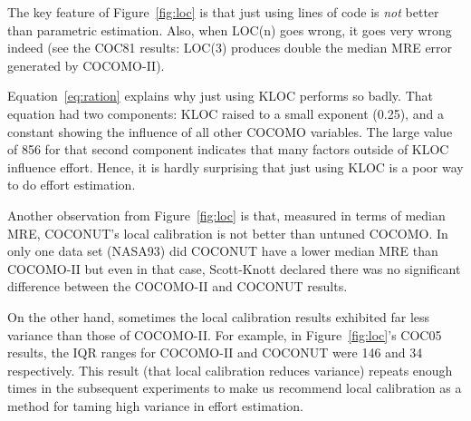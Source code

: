 \documentclass[smallcondesed]{svjour3}
\newcommand{\fig}[1]{Figure~\ref{fig:#1}}
\newcommand{\eq}[1]{Equation~\ref{eq:#1}}
\begin{document}
The key feature of \fig{loc}
is that  just using lines of
code is {\em not}  better than parametric estimation.
Also, when LOC(n) goes wrong, it goes very
wrong indeed (see the COC81 results: LOC(3) produces 
double the median MRE error generated by COCOMO-II).

\eq{ration} explains why just using KLOC performs so badly. 
That equation had two components: KLOC raised to
a small exponent (0.25), and a constant showing the influence of all  other
COCOMO variables. The large value of 856 for that second component
indicates that many factors outside of KLOC influence effort. Hence, it is hardly
surprising that just using KLOC is a poor way to do effort estimation.

Another observation from \fig{loc} is that,
measured in terms of median MRE, COCONUT's local
calibration is not  better
than  untuned COCOMO. In only one data set
(NASA93) did COCONUT have a lower median MRE than
COCOMO-II but even in that case, Scott-Knott
declared there was no significant difference between
the COCOMO-II and COCONUT results.

On the other hand, sometimes the local calibration
results exhibited far less variance than those of
COCOMO-II. For example, in \fig{loc}'s COC05
results, the IQR ranges for
COCOMO-II and COCONUT were 146 and 34 respectively.
This result (that local calibration reduces
variance) repeats enough times in the subsequent
experiments to make us recommend local calibration
as a method for taming high variance in effort
estimation.
\end{document}
